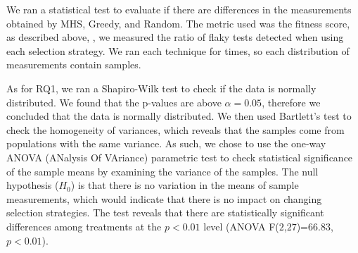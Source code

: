 \documentclass[conference]{IEEEtran}
\begin{document}
We ran a statistical test to evaluate if there are differences in the
measurements obtained by MHS, Greedy, and Random. The metric used was the fitness score, as described above, \ie{}, we measured the ratio of flaky tests detected when using each selection strategy. We ran each technique for \numExecutionsRQThree{} times, so each distribution of measurements contain \numExecutionsRQThree{} samples.

As for RQ1, we ran a Shapiro-Wilk test to check if the data is normally distributed. We found that the p-values are above $\alpha=0.05$, therefore we concluded that the data is normally distributed. We then used Bartlett's test to check the homogeneity of variances, which reveals that the samples come from  populations with the same variance.
As such, we chose to use the one-way ANOVA (ANalysis Of VAriance) parametric test to check statistical significance of the sample means by examining the variance of the samples. The null hypothesis ($H_0$) is that there is no variation in the means of sample measurements, which would indicate that there is no impact on changing selection strategies. 
The test reveals that there are statistically significant differences among treatments at the $p<0.01$ level (ANOVA F($2$,$27$)=$66.83$, $p<0.01$).
\end{document}
